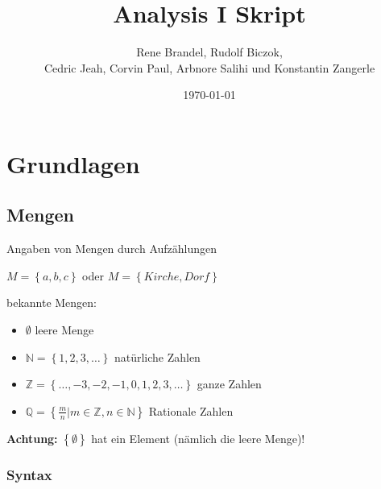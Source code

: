 \documentclass[fleqn]{scrbook}
\newcommand{\titleText}{Analysis I Skript}
\newcommand{\mainAuthor}{Rene Brandel, Rudolf Biczok, \texorpdfstring{\\}{} Cedric Jeah, Corvin Paul, Arbnore Salihi und Konstantin Zangerle}
\newcommand{\N}{\mathbb{N}}
\begin{document}
\title{\titleText}
\date{\today}
\author{\mainAuthor}
\maketitle

\newpage
\tableofcontents
\newpage

\chapter{Grundlagen}

\section{Mengen}

Angaben von Mengen durch Aufzählungen

$M=\left\{ a,b,c \right\}$ oder $M=\left\{ Kirche, Dorf\right\}$

bekannte Mengen:
\begin{itemize}
  \item $\emptyset$ leere Menge
  \item $\N = \left\{ 1,2,3,\ldots \right\}$ natürliche Zahlen
  \item $\mathbb{Z} = \left\{ \ldots,-3,-2,-1,0,1,2,3,\ldots \right\}$ ganze Zahlen
  \item $\mathbb{Q} = \left\{ \frac{m}{n}|m \in \mathbb{Z},n \in \N \right\}$ Rationale Zahlen
\end{itemize}

\textbf{Achtung:} $\left\{ \emptyset \right\}$ hat ein Element (nämlich die leere Menge)!

\subsection{Syntax}
\end{document}
